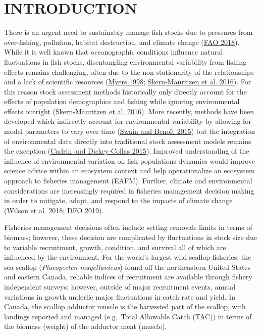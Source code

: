 \documentclass[
]{article}
\begin{document}
\hypertarget{ref-intro}{%
\section{INTRODUCTION}\label{ref-intro}}

There is an urgent need to sustainably manage fish stocks due to pressures from over-fishing, pollution, habitat destruction, and climate change (\protect\hyperlink{ref-faoStateWorldFisheries2018}{FAO 2018}). While it is well known that oceanographic conditions influence natural fluctuations in fish stocks, disentangling environmental variability from fishing effects remains challenging, often due to the non-stationarity of the relationships and a lack of scientific resources (\protect\hyperlink{ref-myersWhenEnvironmentRecruitment1998}{Myers 1998}; \protect\hyperlink{ref-skern-mauritzenEcosystemProcessesAre2016}{Skern‐Mauritzen et al. 2016}). For this reason stock assessment methods historically only directly account for the effects of population demographics and fishing while ignoring environmental effects outright (\protect\hyperlink{ref-skern-mauritzenEcosystemProcessesAre2016}{Skern‐Mauritzen et al. 2016}). More recently, methods have been developed which indirectly account for environmental variability by allowing for model parameters to vary over time (\protect\hyperlink{ref-swainExtremeIncreasesNatural2015}{Swain and Benoît 2015}) but the integration of environmental data directly into traditional stock assessment models remains the exception (\protect\hyperlink{ref-cadrinStockAssessmentMethods2015}{Cadrin and Dickey-Collas 2015}). Improved understanding of the influence of environmental variation on fish populations dynamics would improve science advice within an ecosystem context and help operationalize an ecosystem approach to fisheries management (EAFM). Further, climate and environmental considerations are increasingly required in fisheries management decision making in order to mitigate, adapt, and respond to the impacts of climate change (\protect\hyperlink{ref-wilsonAdaptiveComanagementAchieve2018}{Wilson et al. 2018}; \protect\hyperlink{ref-dfoActAmendFisheries2019}{DFO 2019}).

Fisheries management decisions often include setting removals limits in terms of biomass; however, these decision are complicated by fluctuations in stock size due to variable recruitment, growth, condition, and survival all of which are influenced by the environment. For the world's largest wild scallop fisheries, the sea scallop (\emph{Placopecten magellanicus}) found off the northeastern United States and eastern Canada, reliable indices of recruitment are available through fishery independent surveys; however, outside of major recruitment events, annual variations in growth underlie major fluctuations in catch rate and yield. In Canada, the scallop adductor muscle is the harvested part of the scallop, with landings reported and managed (e.g.~Total Allowable Catch (TAC)) in terms of the biomass (weight) of the adductor meat (muscle).
\end{document}
